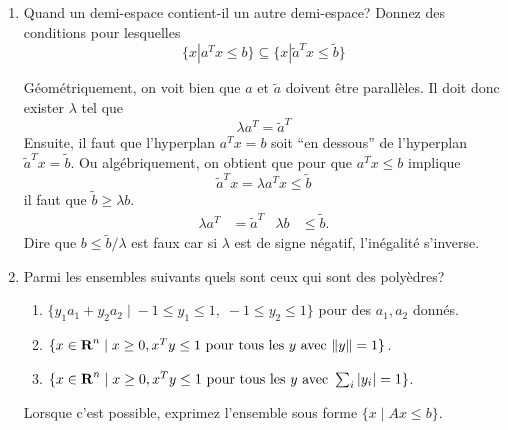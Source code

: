 \begin{enumerate}
  \item Quand un demi-espace contient-il un autre demi-espace? Donnez des
    conditions pour lesquelles
    $$\{x | a^Tx \leq b \} \subseteq \{x | \tilde a ^Tx \leq \tilde b \}$$


    \begin{solution}
      Géométriquement, on voit bien que $a$ et $\tilde{a}$ doivent être
      parallèles.
      Il doit donc exister $\lambda$ tel que
      \[ \lambda a^{T} = \tilde{a}^{T} \]
      Ensuite, il faut que l'hyperplan $a^Tx = b$ soit ``en dessous''
      de l'hyperplan $\tilde{a}^Tx = \tilde{b}$.
      Ou algébriquement, on obtient que pour que $a^Tx \leq b$ implique
      \[ \tilde{a}^Tx = \lambda a^Tx \leq \tilde{b} \]
      il faut que $\tilde{b} \geq \lambda b$.
      \begin{align*}
        \lambda a^T & = \tilde{a}^T & \lambda b & \leq \tilde{b}.
      \end{align*}
      Dire que $b \leq \tilde{b}/\lambda$ est faux car si $\lambda$ est
      de signe négatif, l'inégalité s'inverse.
    \end{solution}

  \item Parmi les ensembles suivants quels sont ceux qui sont des poly\`edres?

    \begin{enumerate}

      \item $\{y_1 a_1 + y_2 a_2 \; | \; -1 \leq y_1 \leq 1, \; -1 \leq y_2 \leq 1 \}$ pour des $a_1, a_2$
        donnés.

      \item $\{x \in {\mbox{\bf R}}^n \; | \; x \geq 0, x^T y \leq 1 \mbox{ pour tous les } y \mbox{ avec } \| y \| =1 \}$.

      \item $\{x \in {\mbox{\bf R}}^n \; | \; x \geq 0, x^T y \leq 1 \mbox{ pour tous les } y \mbox{ avec } \sum_i |y_i | =1 \}$.

    \end{enumerate}

    Lorsque c'est possible, exprimez l'ensemble sous forme $\{x \; | \; Ax \leq b\}$.




\end{enumerate}
